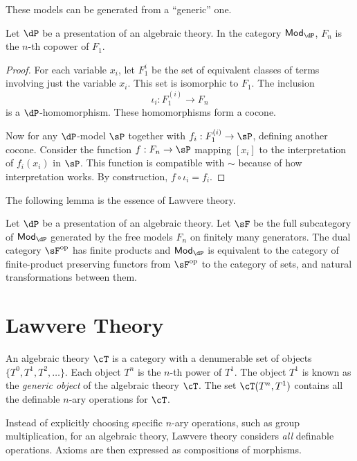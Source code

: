 \documentclass{amsart}
\begin{document}
These models can be generated from a ``generic'' one.
\begin{lem}
  Let $\dP$ be a presentation of an algebraic theory.
  In the category $\mathsf{Mod}_{\dP}$, $F_{n}$ is the $n$-th copower of $F_{1}$.
\end{lem}
\begin{proof}
  For each variable $x_{i}$, let $F^{i}_{1}$ be the set of equivalent classes of terms involving just the variable $x_{i}$.
  This set is isomorphic to $F_{1}$.
  The inclusion
  \[
    \iota_{i} : F^{(i)}_{1} \to F_{n}
  \]
  is a $\dP$-homomorphism.
  These homomorphisms form a cocone.

  Now for any $\dP$-model $\sP$ together with $f_{i} : F^{(i)}_{1} \to \sP$, defining another cocone.
  Consider the function $f : F_{n} \to \sP$ mapping $[x_{i}]$ to the interpretation of $f_{i}(x_{i})$ in $\sP$.
  This function is compatible with $\sim$ because of how interpretation works.
  By construction, $f \circ \iota_{i} = f_{i}$.
\end{proof}

The following lemma is the essence of Lawvere theory.
\begin{lem}
  Let $\dP$ be a presentation of an algebraic theory.
  Let $\sF$ be the full subcategory of $\mathsf{Mod}_{\dP}$ generated by the free models $F_{n}$ on finitely many generators.
  The dual category $\sF\op$ has finite products and $\mathsf{Mod}_{\dP}$ is equivalent to the category of finite-product preserving functors from $\sF\op$ to the category of sets,
  and natural transformations between them.
\end{lem}

\section{Lawvere Theory}
\label{sec:lawvere-theory}

\begin{defn}
  An algebraic theory $\cT$ is a category with a denumerable set of objects $\{T^{0}, T^{1}, T^{2}, \ldots\}$.
  Each object $T^{n}$ is the $n$-th power of $T^{1}$.
  The object $T^{1}$ is known as the \emph{generic object} of the algebraic theory $\cT$.
  The set $\cT(T^{n},T^{1})$ contains all the definable $n$-ary operations for $\cT$.
\end{defn}

Instead of explicitly choosing specific $n$-ary operations, such as group multiplication, for an algebraic theory, Lawvere theory considers \emph{all} definable operations.
Axioms are then expressed as compositions of morphisms.
\end{document}
